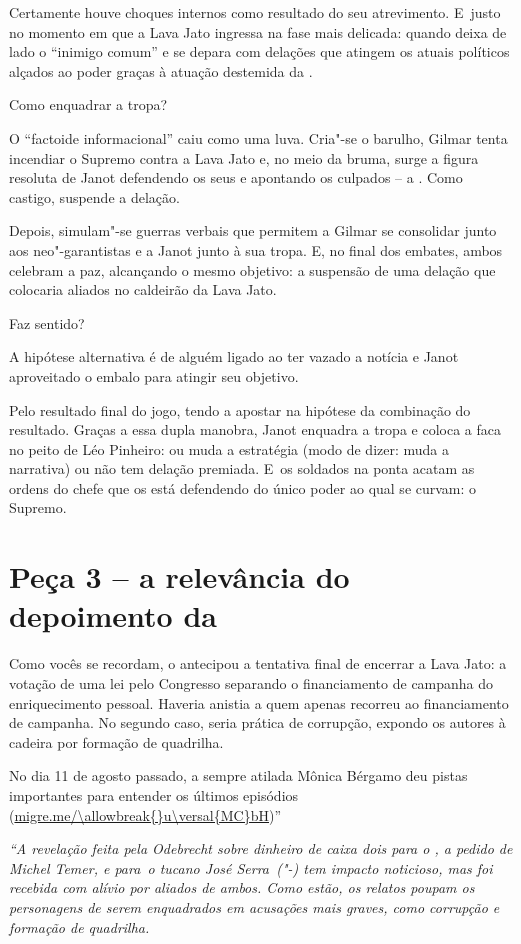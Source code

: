 Certamente houve choques internos como resultado do seu atrevimento. E~justo no momento em que a Lava Jato ingressa na fase mais delicada:
quando deixa de lado o ``inimigo comum'' e se depara com delações que
atingem os atuais políticos alçados ao poder graças à atuação destemida
da .

Como enquadrar a tropa?

O ``factoide informacional'' caiu como uma luva. Cria"-se o barulho,
Gilmar tenta incendiar o Supremo contra a Lava Jato e, no meio da bruma,
surge a figura resoluta de Janot defendendo os seus e apontando os
culpados -- a . Como castigo, suspende a delação.

Depois, simulam"-se guerras verbais que permitem a Gilmar se consolidar
junto aos neo"-garantistas e a Janot junto à sua tropa. E, no final dos
embates, ambos celebram a paz, alcançando o mesmo objetivo: a suspensão
de uma delação que colocaria aliados no caldeirão da Lava Jato.

Faz sentido?

A hipótese alternativa é de alguém ligado ao  ter vazado a notícia e
Janot aproveitado o embalo para atingir seu objetivo.

Pelo resultado final do jogo, tendo a apostar na hipótese da combinação
do resultado. Graças a essa dupla manobra, Janot enquadra a tropa e
coloca a faca no peito de Léo Pinheiro: ou muda a estratégia (modo de
dizer: muda a narrativa) ou não tem delação premiada. E~os soldados na
ponta acatam as ordens do chefe que os está defendendo do único poder ao
qual se curvam: o Supremo.

\section{Peça 3 -- a relevância do depoimento da }

Como vocês se recordam, o  antecipou a tentativa final de encerrar a
Lava Jato: a votação de uma lei pelo Congresso separando o financiamento
de campanha do enriquecimento pessoal. Haveria anistia a quem apenas
recorreu ao financiamento de campanha. No segundo caso, seria prática de
corrupção, expondo os autores à cadeira por formação de quadrilha.

No dia 11 de agosto passado, a sempre atilada Mônica Bérgamo deu pistas
importantes para entender os últimos episódios
(\url{migre.me/\allowbreak{}u\versal{MC}bH})''

\emph{``A revelação feita pela Odebrecht sobre dinheiro de caixa dois
para o , a pedido de Michel Temer, e
para~{o
tucano José Serra}~("-) tem impacto noticioso, mas foi recebida com
alívio por aliados de ambos. Como estão, os relatos poupam os
personagens de serem enquadrados em acusações mais graves, como
corrupção e formação de quadrilha.}

